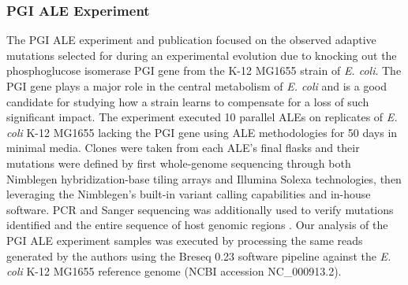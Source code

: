 \documentclass[12pt,final,masters,chapterheads]{ucsd}  %
\begin{document}
\subsubsection{PGI ALE Experiment}
%
%
The PGI ALE experiment and publication focused on the observed adaptive mutations selected for during an experimental evolution due to knocking out the phosphoglucose isomerase PGI gene from the K-12 MG1655 strain of \textit{E. coli}. The PGI gene plays a major role in the central metabolism of \textit{E. coli} and is a good candidate for studying how a strain learns to compensate for a loss of such significant impact. The experiment executed 10 parallel ALEs on replicates of \textit{E. coli} K-12 MG1655 lacking the PGI gene using ALE methodologies for 50 days in minimal media. Clones were taken from each ALE's final flasks and their mutations were defined by first whole-genome sequencing through both Nimblegen hybridization-base tiling arrays and Illumina Solexa technologies, then leveraging the Nimblegen's built-in variant calling capabilities and in-house software. PCR and Sanger sequencing was additionally used to verify mutations identified and the entire sequence of host genomic regions \cite{10.1371/journal.pgen.1001186}. Our analysis of the PGI ALE experiment samples was executed by processing the same reads generated by the authors using the Breseq 0.23 software pipeline against the \textit{E. coli} K-12 MG1655 reference genome (NCBI accession NC\_000913.2).
%
%
%
%
\end{document}
